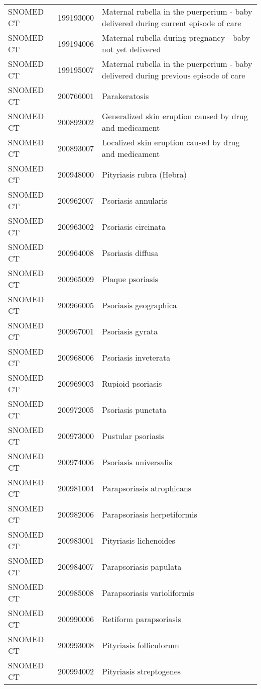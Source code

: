 \begin{longtable}{p{}p{}p{}}
  SNOMED CT & 199193000 & Maternal rubella in the puerperium - baby delivered during current episode of care \\ 
  SNOMED CT & 199194006 & Maternal rubella during pregnancy - baby not yet delivered \\ 
  SNOMED CT & 199195007 & Maternal rubella in the puerperium - baby delivered during previous episode of care \\ 
  SNOMED CT & 200766001 & Parakeratosis \\ 
  SNOMED CT & 200892002 & Generalized skin eruption caused by drug and medicament \\ 
  SNOMED CT & 200893007 & Localized skin eruption caused by drug and medicament \\ 
  SNOMED CT & 200948000 & Pityriasis rubra (Hebra) \\ 
  SNOMED CT & 200962007 & Psoriasis annularis \\ 
  SNOMED CT & 200963002 & Psoriasis circinata \\ 
  SNOMED CT & 200964008 & Psoriasis diffusa \\ 
  SNOMED CT & 200965009 & Plaque psoriasis \\ 
  SNOMED CT & 200966005 & Psoriasis geographica \\ 
  SNOMED CT & 200967001 & Psoriasis gyrata \\ 
  SNOMED CT & 200968006 & Psoriasis inveterata \\ 
  SNOMED CT & 200969003 & Rupioid psoriasis \\ 
  SNOMED CT & 200972005 & Psoriasis punctata \\ 
  SNOMED CT & 200973000 & Pustular psoriasis \\ 
  SNOMED CT & 200974006 & Psoriasis universalis \\ 
  SNOMED CT & 200981004 & Parapsoriasis atrophicans \\ 
  SNOMED CT & 200982006 & Parapsoriasis herpetiformis \\ 
  SNOMED CT & 200983001 & Pityriasis lichenoides \\ 
  SNOMED CT & 200984007 & Parapsoriasis papulata \\ 
  SNOMED CT & 200985008 & Parapsoriasis varioliformis \\ 
  SNOMED CT & 200990006 & Retiform parapsoriasis \\ 
  SNOMED CT & 200993008 & Pityriasis folliculorum \\ 
  SNOMED CT & 200994002 & Pityriasis streptogenes \\ 

\end{longtable}
